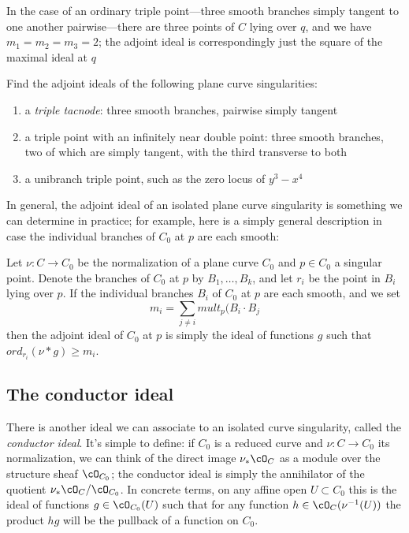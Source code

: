 \begin{example}
In the case of an ordinary triple point---three smooth branches simply tangent to one another pairwise---there are three points of $C$ lying over $q$, and we have $m_1=m_2=m_3= 2$; the adjoint ideal is correspondingly just the square of the maximal ideal at $q$
\end{example}

\begin{exercise}
Find the adjoint ideals of the following plane curve singularities:
\begin{enumerate}
\item a \emph{triple tacnode}: three smooth branches, pairwise simply tangent
\item a triple point with an infinitely near double point: three smooth branches, two of which are simply tangent, with the third transverse to both
\item a unibranch triple point, such as the zero locus of $y^3-x^4$
\end{enumerate}
\end{exercise}

In general, the adjoint ideal of an isolated plane curve singularity is something we can determine in practice; for example, here is a simply general description in case the individual branches of $C_0$ at $p$ are each smooth:

\begin{proposition}
Let $\nu : C \to C_0$ be the normalization of a plane curve $C_0$ and $p \in C_0$ a singular point. Denote the branches of $C_0$ at $p$ by $B_1,\dots,B_k$, and let $r_i$ be the point in $B_i$ lying over $p$. If the individual branches $B_i$ of $C_0$ at $p$ are each smooth, and we set
$$
m_i = \sum_{j \neq i} mult_p(B_i \cdot B_j
$$
then the adjoint ideal of $C_0$ at $p$ is simply the ideal of functions $g$ such that $ord_{r_i}(\nu*g) \geq m_i$.
\end{proposition}

\subsection{The conductor ideal}

There is another ideal we can associate to an isolated curve singularity, called the \emph{conductor ideal}. It's simple to define: if $C_0$ is a reduced curve and $\nu : C \to C_0$ its normalization, we can think of the direct image $\nu_*\cO_C$ as a module over the structure sheaf $\cO_{C_0}$; the conductor ideal is simply the annihilator of the quotient $\nu_*\cO_C/\cO_{C_0}$. In concrete terms, on any affine open $U \subset C_0$ this is the ideal of functions $g \in \cO_{C_0}(U)$ such that for any function $h \in \cO_C(\nu^{-1}(U))$ the product $hg$ will be the pullback of a function on $C_0$.

